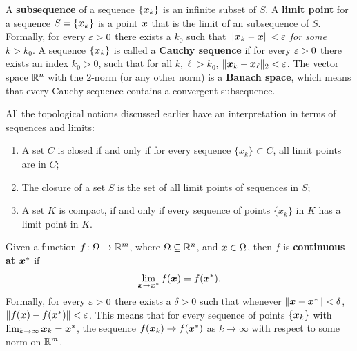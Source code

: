 A \textbf{subsequence} of a sequence $\{\bm{x}_k\}$ is an infinite subset of $S$.
A \textbf{limit point} for a sequence $S=\{\bm{x}_k\}$ is a point $\bm{x}$ that is the limit of an subsequence of $S$. Formally, for every $\varepsilon>0$ there exists a $k_0$ such that $\Vert {\bm{x}_k-\bm{x}}\Vert<\varepsilon$ {\em for some} $k>k_0$. A sequence $\{\bm{x}_k\}$ is called a \textbf{Cauchy sequence} if for every $\varepsilon>0$ there exists an index $k_0>0$, such that for all $k,\ell>k_0$, $\Vert {\bm{x}_k-\bm{x}_{\ell}}\Vert_2<\varepsilon$. The vector space $\mathbb{R}^n$ with the $2$-norm (or any other norm) is a \textbf{Banach space}, which means that every Cauchy sequence contains a convergent subsequence.

All the topological notions discussed earlier have an interpretation in terms of sequences and limits:
\begin{enumerate}
\item A set $C$ is closed if and only if for every sequence $\{x_k\}\subset C$, all limit points are in $C$; 
\item The closure of a set $S$ is the set of all limit points of sequences in $S$;
\item A set $K$ is compact, if and only if every sequence of points $\{x_k\}$ in $K$ has a limit point in $K$.
\end{enumerate}

Given a function $f\colon \Omega \to \mathbb{R}^m$, where $\Omega\subseteq \mathbb{R}^n$, and $\bm{x}\in \Omega$, then $f$ is \textbf{continuous at $\bm{x}^*$} if 
\begin{equation*}
 \lim_{\bm{x}\to \bm{x}^*} f(\bm{x}) = f(\bm{x}^*).
\end{equation*}
Formally, for every $\varepsilon>0$ there exists a $\delta>0$ such that whenever $\Vert {\bm{x}-\bm{x}^*}\Vert<\delta$, $\Vert {f(\bm{x})-f(\bm{x}^*)}\Vert<\varepsilon$.
This means that for every sequence of points $\{\bm{x}_k\}$ with $\lim_{k\to \infty}\bm{x}_k=\bm{x}^*$, the sequence $f(\bm{x}_k)\to f(\bm{x}^*)$ as $k\to \infty$ with respect to some norm on $\mathbb{R}^m$.

